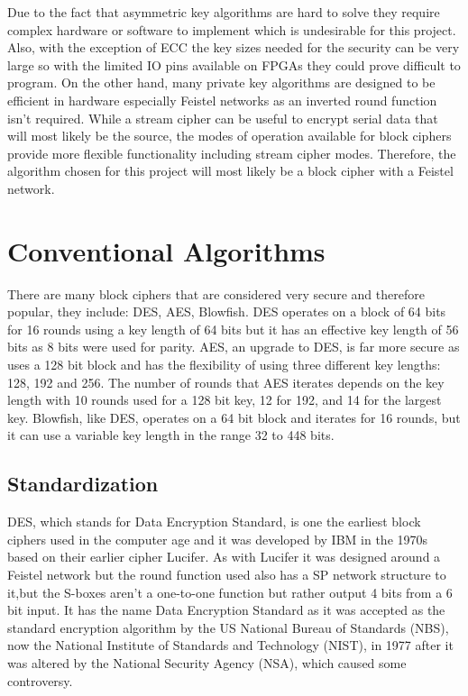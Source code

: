 \documentclass[12pt,twoside,a4paper]{report}
\begin{document}
	Due to the fact that asymmetric key algorithms are hard to solve they require complex hardware or software to implement which is undesirable for this project. Also, with the exception of ECC the key sizes needed for the security can be very large so with the limited IO pins available on FPGAs they could prove difficult to program. On the other hand, many private key algorithms are designed to be efficient in hardware especially Feistel networks as an inverted round function isn't required. While a stream cipher can be useful to encrypt serial data that will most likely be the source, the modes of operation available for block ciphers provide more flexible functionality including stream cipher modes. Therefore, the algorithm chosen for this project will most likely be a block cipher with a Feistel network.
    
	\section{Conventional Algorithms}

    
	There are many block ciphers that are considered very secure and therefore popular, they include: DES\cite{ComputerSecurityDivision1999}, AES\cite{ComputerSecurityDivision2001}, Blowfish\cite{BruceSchneier1994}. DES operates on a block of 64 bits for 16 rounds using a key length of 64 bits but it has an effective key length of 56 bits as 8 bits were used for parity. AES, an upgrade to DES, is far more secure as uses a 128 bit block and has the flexibility of using three different key lengths: 128, 192 and 256. The number of rounds that AES iterates depends on the key length with 10 rounds used for a 128 bit key, 12 for 192, and 14 for the largest key. Blowfish, like DES, operates on a 64 bit block and iterates for 16 rounds, but it can use a variable key length in the range 32 to 448 bits.
    
	\subsection{Standardization}
	DES, which stands for Data Encryption Standard, is one the earliest block ciphers used in the computer age and it was developed by IBM in the 1970s based on their earlier cipher Lucifer. As with Lucifer it was designed around a Feistel network but the round function used also has a SP network structure to it,but the S-boxes aren't a one-to-one function but rather output 4 bits from a 6 bit input. It has the name Data Encryption Standard as it was accepted as the standard encryption algorithm by the US National Bureau of Standards (NBS), now the National Institute of Standards and Technology (NIST), in 1977 after it was altered by the National Security Agency (NSA), which caused some controversy\cite{ComputerSecurityDivision1999}.
    
\end{document}
